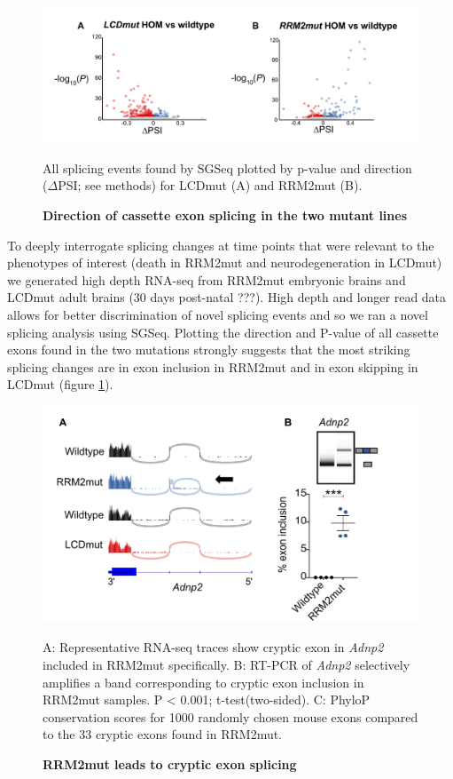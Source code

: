 \begin{figure}[h!]
	\centering
	\includegraphics[width=18cm]{Figures/05_tdp_mice/transcriptome_scatters.png}
	\caption{\textbf{Direction of cassette exon splicing in the two mutant lines}}
	All splicing events found by SGSeq plotted by p-value and direction ($\Delta$PSI; see methods) for LCDmut (A) and RRM2mut (B).
	\label{fig:cassette_scatters}
\end{figure}

To deeply interrogate splicing changes at time points that were relevant to the phenotypes of interest (death in RRM2mut and neurodegeneration in LCDmut) we generated high depth RNA-seq from RRM2mut embryonic brains and LCDmut adult brains (30 days post-natal ???). High depth and longer read data allows for better discrimination of novel splicing events and so we ran a novel splicing analysis using SGSeq. Plotting the direction and P-value of all cassette exons found in the two mutations strongly suggests that the most striking splicing changes are in exon inclusion in RRM2mut and in exon skipping in LCDmut (figure \ref{fig:cassette_scatters}).

\begin{figure}[h!]
	\begin{center}
		\includegraphics[width=14cm]{Figures/05_tdp_mice/cryptic_exon_multi.png}
	\end{center}
	\caption{\textbf{RRM2mut leads to cryptic exon splicing}}
	\label{cryptic_multi}
	A: Representative RNA-seq traces show cryptic exon in \textit{Adnp2} included in RRM2mut specifically. B: RT-PCR of \textit{Adnp2} selectively amplifies a band corresponding to cryptic exon inclusion in RRM2mut samples. P < 0.001; t-test(two-sided). C: PhyloP conservation scores for 1000 randomly chosen mouse exons compared to the 33 cryptic exons found in RRM2mut.
\end{figure}

